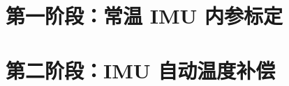 \documentclass[UTF8,openany,11pt,a4paper,fontset=none]{ctexrep}
\begin{document}


\part{第一阶段：常温 IMU 内参标定}





\part{第二阶段：IMU 自动温度补偿}





\appendix


\end{document}
